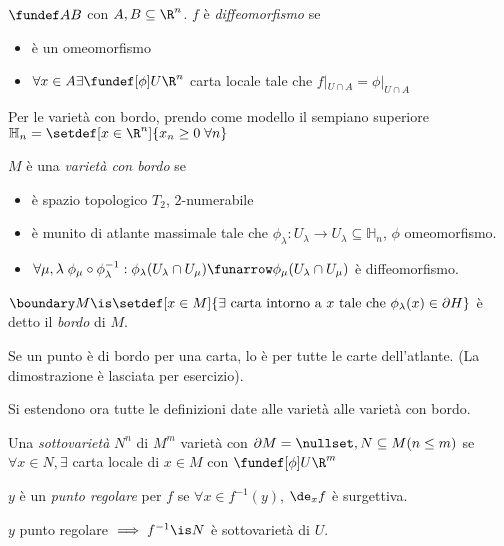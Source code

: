 \begin{defn}
$\fundef AB$ con $A,B\subseteq \R^n$. $f$ è \emph{diffeomorfismo} se
\begin{itemize}
 \item è un omeomorfismo
 \item $\forall x\in A \exists \fundef[\phi] U\R^n$ carta locale tale che $f|_{U\cap A}=\phi|_{U\cap A}$
\end{itemize}
\end{defn}
Per le varietà con bordo, prendo come modello il sempiano superiore $\mathbb H_n=\setdef[x\in\R^n]{x_n\ge 0 \; \forall n}$
\begin{defn}
 $M$ è una \emph{varietà con bordo} se 
 \begin{itemize}
  \item è spazio topologico $T_2$, $2$-numerabile
  \item è munito di atlante massimale tale che $\phi_{\lambda}: U_{\lambda}\rightarrow U_{\lambda}\subseteq\mathbb H_n$, $\phi$ omeomorfismo.
  \item $\forall \mu,\lambda\; \phi_{\mu}\circ\phi_{\lambda}^{-1}:\phi_{\lambda}(U_{\lambda}\cap U_{\mu})\funarrow\phi_{\mu}(U_{\lambda}\cap U_{\mu})$ è diffeomorfismo.
 \end{itemize}
\end{defn}
\begin{defn}[Bordo]
$\boundary M\is \setdef[x\in M]{\exists\text{ carta intorno a }x\text{ tale che } \phi_{\lambda}(x) \in \partial H}$ è detto il \emph{bordo} di $M$.
\end{defn}
\begin{prop}
 Se un punto è di bordo per una carta, lo è per tutte le carte dell'atlante. (La dimostrazione è lasciata per esercizio).
\end{prop}
Si estendono ora tutte le definizioni date alle varietà alle varietà con bordo.
\begin{defn}[Sottovarietà]
 Una \emph{sottovarietà} $N^n$ di $M^m$ varietà con $\partial M = \nullset, N\subseteq M (n\le m)$ se $\forall x\in N, \exists$ carta locale di $x \in M$ con $\fundef[\phi] U\R^m $
\end{defn}
\begin{defn}
 $y$ è un \emph{punto regolare} per $f$ se $\forall x\in f^{-1}(y)$, $\de_xf$ è surgettiva.
\end{defn}
\begin{prop}
 $y$ punto regolare $\implies f^{-1}\is N$ è sottovarietà di $U$.
\end{prop}
